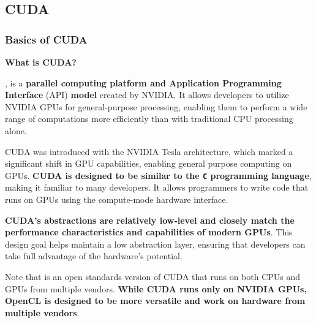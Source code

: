 \subsection{CUDA}

\subsubsection{Basics of CUDA}

\begin{flushleft}
    \textcolor{Green3}{ \textbf{What is CUDA?}}
\end{flushleft}
, is a \textbf{parallel computing platform and Application Programming Interface} (API) \textbf{model} created by NVIDIA. It allows developers to utilize NVIDIA GPUs for general-purpose processing, enabling them to perform a wide range of computations more efficiently than with traditional CPU processing alone.

\highspace
CUDA was introduced with the NVIDIA Tesla architecture, which marked a significant shift in GPU capabilities, enabling general purpose computing on GPUs. \textbf{CUDA is designed to be similar to the \texttt{C} programming language}, making it familiar to many developers. It allows programmers to write code that runs on GPUs using the compute-mode hardware interface.

\highspace
\textbf{CUDA's abstractions are relatively low-level and closely match the performance characteristics and capabilities of modern GPUs}. This design goal helps maintain a low abstraction layer, ensuring that developers can take full advantage of the hardware's potential.

\highspace
Note that  is an open standards version of CUDA that runs on both CPUs and GPUs from multiple vendors. \textbf{While CUDA runs only on NVIDIA GPUs, OpenCL is designed to be more versatile and work on hardware from multiple vendors}.

